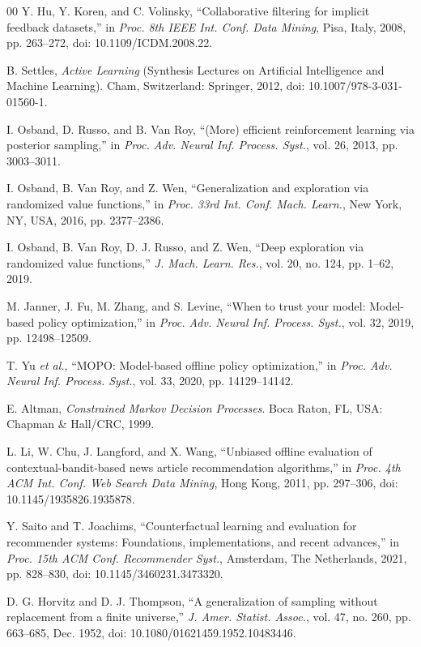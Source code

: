 \documentclass{ieeeaccess}
\begin{document}
\begin{thebibliography}{00}
 Y. Hu, Y. Koren, and C. Volinsky, ``Collaborative filtering for implicit feedback datasets,'' in \emph{Proc. 8th IEEE Int. Conf. Data Mining}, Pisa, Italy, 2008, pp. 263--272, doi: 10.1109/ICDM.2008.22.

 B. Settles, \emph{Active Learning} (Synthesis Lectures on Artificial Intelligence and Machine Learning). Cham, Switzerland: Springer, 2012, doi: 10.1007/978-3-031-01560-1.

 I. Osband, D. Russo, and B. Van Roy, ``(More) efficient reinforcement learning via posterior sampling,'' in \emph{Proc. Adv. Neural Inf. Process. Syst.}, vol. 26, 2013, pp. 3003--3011.

 I. Osband, B. Van Roy, and Z. Wen, ``Generalization and exploration via randomized value functions,'' in \emph{Proc. 33rd Int. Conf. Mach. Learn.}, New York, NY, USA, 2016, pp. 2377--2386.

 I. Osband, B. Van Roy, D. J. Russo, and Z. Wen, ``Deep exploration via randomized value functions,'' \emph{J. Mach. Learn. Res.}, vol. 20, no. 124, pp. 1--62, 2019.

 M. Janner, J. Fu, M. Zhang, and S. Levine, ``When to trust your model: Model-based policy optimization,'' in \emph{Proc. Adv. Neural Inf. Process. Syst.}, vol. 32, 2019, pp. 12498--12509.

 T. Yu \emph{et al.}, ``MOPO: Model-based offline policy optimization,'' in \emph{Proc. Adv. Neural Inf. Process. Syst.}, vol. 33, 2020, pp. 14129--14142.

 E. Altman, \emph{Constrained Markov Decision Processes}. Boca Raton, FL, USA: Chapman \& Hall/CRC, 1999.

 L. Li, W. Chu, J. Langford, and X. Wang, ``Unbiased offline evaluation of contextual-bandit-based news article recommendation algorithms,'' in \emph{Proc. 4th ACM Int. Conf. Web Search Data Mining}, Hong Kong, 2011, pp. 297--306, doi: 10.1145/1935826.1935878.

 Y. Saito and T. Joachims, ``Counterfactual learning and evaluation for recommender systems: Foundations, implementations, and recent advances,'' in \emph{Proc. 15th ACM Conf. Recommender Syst.}, Amsterdam, The Netherlands, 2021, pp. 828--830, doi: 10.1145/3460231.3473320.

 D. G. Horvitz and D. J. Thompson, ``A generalization of sampling without replacement from a finite universe,'' \emph{J. Amer. Statist. Assoc.}, vol. 47, no. 260, pp. 663--685, Dec. 1952, doi: 10.1080/01621459.1952.10483446.


\end{thebibliography}
\end{document}
